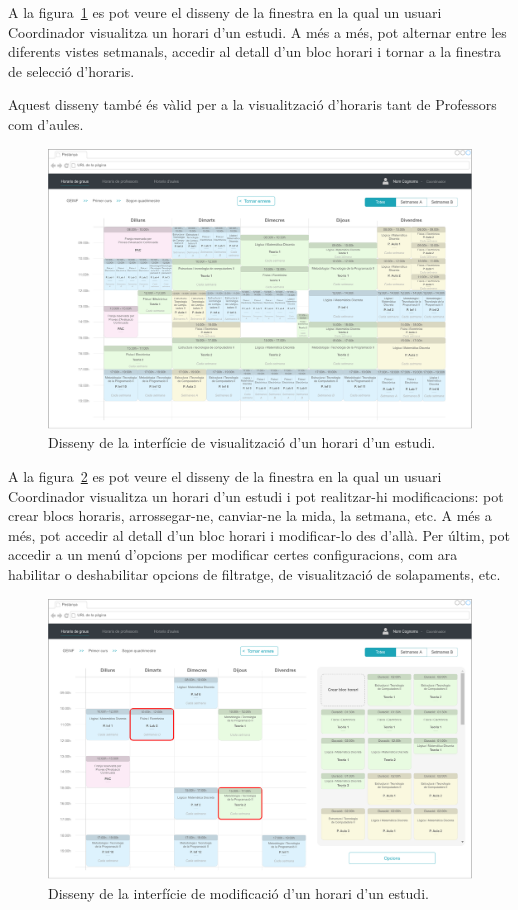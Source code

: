 \documentclass[a4paper,12pt]{ThesisStyle}
\begin{document}
A la figura~\ref{img:horaris_visualitzacio} es pot veure el disseny de la finestra en la qual un usuari Coordinador visualitza un horari d'un estudi. A més a més, pot alternar entre les diferents vistes setmanals, accedir al detall d'un bloc horari i tornar a la finestra de selecció d'horaris.

Aquest disseny també és vàlid per a la visualització d'horaris tant de Professors com d'aules.

\begin{figure}[H]
	\centering
	\includegraphics[width=\textwidth]{assets/interfaces/horaris/visualitzacio.pdf}
	\caption{\label{img:horaris_visualitzacio}Disseny de la interfície de visualització d'un horari d'un estudi.}
\end{figure}

A la figura~\ref{img:horaris_modif} es pot veure el disseny de la finestra en la qual un usuari Coordinador visualitza un horari d'un estudi i pot realitzar-hi modificacions: pot crear blocs horaris, arrossegar-ne, canviar-ne la mida, la setmana, etc. A més a més, pot accedir al detall d'un bloc horari i modificar-lo des d'allà. Per últim, pot accedir a un menú d'opcions per modificar certes configuracions, com ara habilitar o deshabilitar opcions de filtratge, de visualització de solapaments, etc.

\begin{figure}[H]
  \centering
  \includegraphics[width=\textwidth]{assets/interfaces/horaris/modif.pdf}
  \caption{\label{img:horaris_modif}Disseny de la interfície de modificació d'un horari d'un estudi.}
\end{figure}
\end{document}
